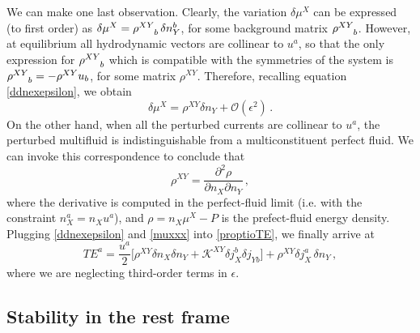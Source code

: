 \documentclass[a4paper, amsfonts, amssymb, amsmath, reprint, showkeys, nofootinbib, twoside, onecolumn,notitlepage]{revtex4-1}
\theoremstyle{definition}
\theoremstyle{theorem}
\begin{document}
We can make one last observation. Clearly, the variation $\delta \mu^X$ can be expressed (to first order) as
$
\delta \mu^X = \rho\indices{^X ^Y _b} \, \delta n_Y^b 
$,
for some background matrix $\rho\indices{^X ^Y _b}$. However, at equilibrium all hydrodynamic vectors are collinear to $u^a$, so that the only expression for $\rho\indices{^X ^Y _b}$ which is compatible with the symmetries of the system is $\rho\indices{^X ^Y _b} = -\rho^{XY} u_b$, for some matrix $\rho^{XY}$. Therefore, recalling equation \eqref{ddnexepsilon}, we obtain
\begin{equation}\label{muxxx}
\delta \mu^X = \rho^{XY} \delta n_Y + \mathcal{O}(\epsilon^2) \, .
\end{equation}
On the other hand, when all the perturbed currents are collinear to $u^a$, the perturbed multifluid is indistinguishable from a multiconstituent perfect fluid. We can invoke this correspondence to conclude that
\begin{equation}
\rho^{XY}= \dfrac{\partial^2 \rho}{\partial n_X \partial n_Y} \, ,
\end{equation}
where the derivative is computed in the perfect-fluid limit (i.e. with the constraint $n_X^a =n_X u^a$), and $\rho= n_X \mu^X -P$ is the prefect-fluid energy density. Plugging \eqref{ddnexepsilon} and \eqref{muxxx} into \eqref{proptioTE}, we finally arrive at
\begin{equation}\label{Lafinale}
TE^a = \dfrac{u^a}{2} \bigg[ \rho^{XY} \delta n_X \delta n_Y + \mathcal{K}^{XY} \delta j_X^b \delta j_{Yb} \bigg] + \rho^{XY} \delta j_X^a \, \delta n_Y \, ,
\end{equation}
where we are neglecting third-order terms in $\epsilon$.

%
%



\subsection{Stability in the rest frame}\label{restuz}
\end{document}
